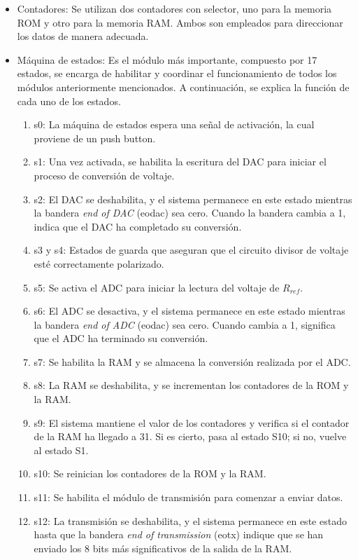 \begin{itemize}
    \item Contadores: Se utilizan dos contadores con selector, uno para la memoria ROM y otro para la memoria RAM. Ambos son empleados para direccionar los datos de manera adecuada.

    \item Máquina de estados: Es el módulo más importante, compuesto por 17 estados, se encarga de habilitar y coordinar el funcionamiento de todos los módulos anteriormente mencionados. A continuación, se explica la función de cada uno de los estados.
    \begin{enumerate}
     \item s0: La máquina de estados espera una señal de activación, la cual proviene de un push button.
     \item s1: Una vez activada, se habilita la escritura del DAC para iniciar el proceso de conversión de voltaje.
     \item s2: El DAC se deshabilita, y el sistema permanece en este estado mientras la bandera \textit{end of DAC} (eodac) sea cero. Cuando la bandera cambia a 1, indica que el DAC ha completado su conversión.
     \item s3 y s4: Estados de guarda que aseguran que el circuito divisor de voltaje esté correctamente polarizado.
     \item s5: Se activa el ADC para iniciar la lectura del voltaje de $R_{ref}$.
     \item s6: El ADC se desactiva, y el sistema permanece en este estado mientras la bandera \textit{end of ADC} (eodac) sea cero. Cuando cambia a 1, significa que el ADC ha terminado su conversión.
     \item s7: Se habilita la RAM y se almacena la conversión realizada por el ADC.
     \item s8: La RAM se deshabilita, y se incrementan los contadores de la ROM y la RAM.
     \item s9: El sistema mantiene el valor de los contadores y verifica si el contador de la RAM ha llegado a 31. Si es cierto, pasa al estado S10; si no, vuelve al estado S1.
     \item s10: Se reinician los contadores de la ROM y la RAM.
     \item s11: Se habilita el módulo de transmisión para comenzar a enviar datos.
     \item s12: La transmisión se deshabilita, y el sistema permanece en este estado hasta que la bandera \textit{end of transmission} (eotx) indique que se han enviado los 8 bits más significativos de la salida de la RAM. 

\end{enumerate}
\end{itemize}
